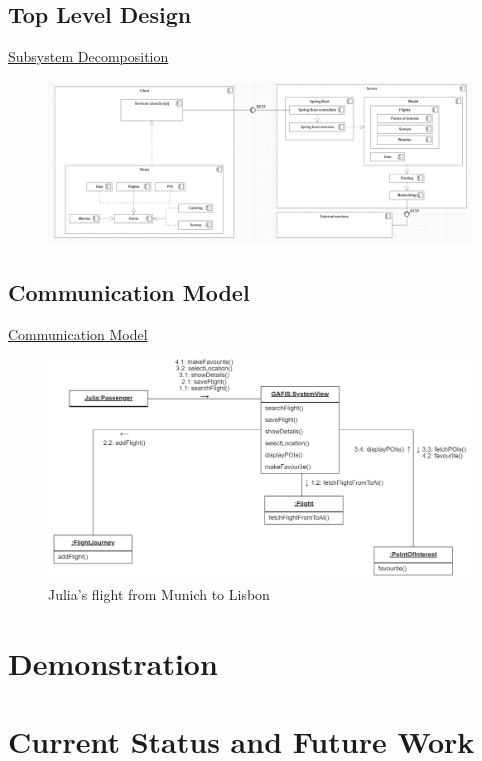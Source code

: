 \documentclass{beamer}
\begin{document}
\subsection{Top Level Design}
\begin{frame}{\href{run:../images/SubsystemDecomposition.PNG}{Subsystem Decomposition}}
	\begin{figure}
		\includegraphics[width=\textwidth]{../images/SubsystemDecomposition.PNG}
	\end{figure}
\end{frame}
\subsection{Communication Model}
\begin{frame}{\href{run:../images/ScenarioOneCommunication.png}{Communication Model}}
	\begin{figure}
		\includegraphics[width=.8\textwidth]{../images/ScenarioOneCommunication.png}
		\caption{Julia's flight from Munich to Lisbon}
	\end{figure}
\end{frame}
\section{Demonstration}
\section{Current Status and Future Work}
\end{document}
